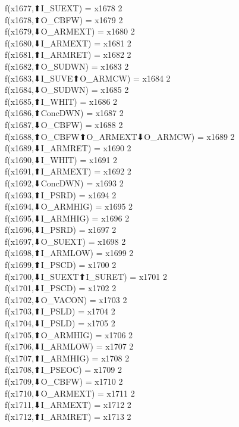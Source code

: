 f(x1677,⬆I_SUEXT) = x1678 {2} \\
f(x1678,⬆O_CBFW) = x1679 {2} \\
f(x1679,⬇O_ARMEXT) = x1680 {2} \\
f(x1680,⬇I_ARMEXT) = x1681 {2} \\
f(x1681,⬆I_ARMRET) = x1682 {2} \\
f(x1682,⬆O_SUDWN) = x1683 {2} \\
f(x1683,⬇I_SUVE⬆O_ARMCW) = x1684 {2} \\
f(x1684,⬇O_SUDWN) = x1685 {2} \\
f(x1685,⬆I_WHIT) = x1686 {2} \\
f(x1686,⬆ConcDWN) = x1687 {2} \\
f(x1687,⬇O_CBFW) = x1688 {2} \\
f(x1688,⬆O_CBFW⬆O_ARMEXT⬇O_ARMCW) = x1689 {2} \\
f(x1689,⬇I_ARMRET) = x1690 {2} \\
f(x1690,⬇I_WHIT) = x1691 {2} \\
f(x1691,⬆I_ARMEXT) = x1692 {2} \\
f(x1692,⬇ConcDWN) = x1693 {2} \\
f(x1693,⬆I_PSRD) = x1694 {2} \\
f(x1694,⬇O_ARMHIG) = x1695 {2} \\
f(x1695,⬇I_ARMHIG) = x1696 {2} \\
f(x1696,⬇I_PSRD) = x1697 {2} \\
f(x1697,⬇O_SUEXT) = x1698 {2} \\
f(x1698,⬆I_ARMLOW) = x1699 {2} \\
f(x1699,⬆I_PSCD) = x1700 {2} \\
f(x1700,⬇I_SUEXT⬆I_SURET) = x1701 {2} \\
f(x1701,⬇I_PSCD) = x1702 {2} \\
f(x1702,⬇O_VACON) = x1703 {2} \\
f(x1703,⬆I_PSLD) = x1704 {2} \\
f(x1704,⬇I_PSLD) = x1705 {2} \\
f(x1705,⬆O_ARMHIG) = x1706 {2} \\
f(x1706,⬇I_ARMLOW) = x1707 {2} \\
f(x1707,⬆I_ARMHIG) = x1708 {2} \\
f(x1708,⬆I_PSEOC) = x1709 {2} \\
f(x1709,⬇O_CBFW) = x1710 {2} \\
f(x1710,⬇O_ARMEXT) = x1711 {2} \\
f(x1711,⬇I_ARMEXT) = x1712 {2} \\
f(x1712,⬆I_ARMRET) = x1713 {2} \\
